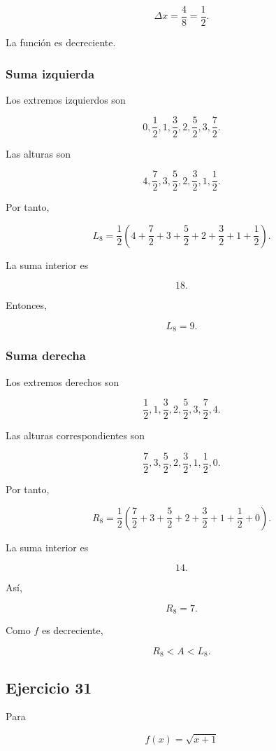 \documentclass[12pt]{article}
\begin{document}
\[
\Delta x=
\frac{4}{8}
=
\frac12.
\]

La función es decreciente.

\subsubsection*{Suma izquierda}

Los extremos izquierdos son

\[
0,\frac12,1,\frac32,2,\frac52,3,\frac72.
\]

Las alturas son

\[
4,\frac72,3,\frac52,2,\frac32,1,\frac12.
\]

Por tanto,

\[
L_8
=
\frac12
\left(
4+\frac72+3+\frac52+2+\frac32+1+\frac12
\right).
\]

La suma interior es

\[
18.
\]

Entonces,

\[
\boxed{L_8=9}.
\]

\subsubsection*{Suma derecha}

Los extremos derechos son

\[
\frac12,1,\frac32,2,\frac52,3,\frac72,4.
\]

Las alturas correspondientes son

\[
\frac72,3,\frac52,2,\frac32,1,\frac12,0.
\]

Por tanto,

\[
R_8
=
\frac12
\left(
\frac72+3+\frac52+2+\frac32+1+\frac12+0
\right).
\]

La suma interior es

\[
14.
\]

Así,

\[
\boxed{R_8=7}.
\]

Como \(f\) es decreciente,

\[
\boxed{
R_8< A <L_8
}.
\]

\subsection*{Ejercicio 31}

Para

\[
f(x)=\sqrt{x+1}
\]
\end{document}
